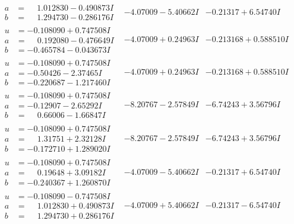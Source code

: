 \documentclass[1p]{elsarticle_modified}
\theoremstyle{definition}
\begin{document}
$$\begin{array}{c|c|c}
\begin{aligned}
a &= \phantom{-}1.012830 - 0.490873 I \\
b &= \phantom{-}1.294730 - 0.286176 I\end{aligned}
 & -4.07009 - 5.40662 I & -0.21317 + 6.54740 I \\ \hline\begin{aligned}
u &= -0.108090 + 0.747508 I \\
a &= \phantom{-}0.192080 - 0.476649 I \\
b &= -0.465784 - 0.043673 I\end{aligned}
 & -4.07009 + 0.24963 I & -0.213168 + 0.588510 I \\ \hline\begin{aligned}
u &= -0.108090 + 0.747508 I \\
a &= -0.50426 - 2.37465 I \\
b &= -0.220687 - 1.217460 I\end{aligned}
 & -4.07009 + 0.24963 I & -0.213168 + 0.588510 I \\ \hline\begin{aligned}
u &= -0.108090 + 0.747508 I \\
a &= -0.12907 - 2.65292 I \\
b &= \phantom{-}0.66006 - 1.66847 I\end{aligned}
 & -8.20767 - 2.57849 I & -6.74243 + 3.56796 I \\ \hline\begin{aligned}
u &= -0.108090 + 0.747508 I \\
a &= \phantom{-}1.31751 + 2.32128 I \\
b &= -0.172710 + 1.289020 I\end{aligned}
 & -8.20767 - 2.57849 I & -6.74243 + 3.56796 I \\ \hline\begin{aligned}
u &= -0.108090 + 0.747508 I \\
a &= \phantom{-}0.19648 + 3.09182 I \\
b &= -0.240367 + 1.260870 I\end{aligned}
 & -4.07009 - 5.40662 I & -0.21317 + 6.54740 I \\ \hline\begin{aligned}
u &= -0.108090 - 0.747508 I \\
a &= \phantom{-}1.012830 + 0.490873 I \\
b &= \phantom{-}1.294730 + 0.286176 I\end{aligned}
 & -4.07009 + 5.40662 I & -0.21317 - 6.54740 I \\ \hline\begin{aligned}

\end{aligned}
\end{array}$$
\end{document}
